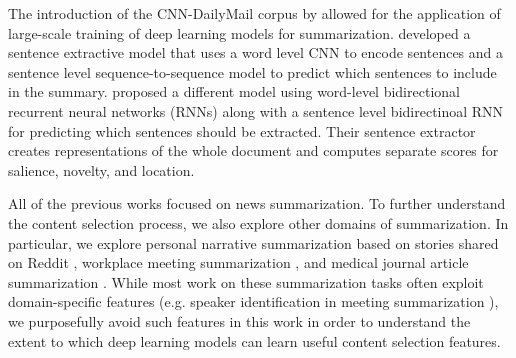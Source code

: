 The introduction of the CNN-DailyMail corpus by \citet{nips15_hermann} 
allowed for the application of large-scale training of deep learning models for summarization.
\citet{cheng2016neural} %
developed a sentence extractive
model that uses a word level 
CNN to encode 
sentences and a sentence level sequence-to-sequence model to predict 
which sentences to include in the summary. \citet{nallapati2017summarunner}
proposed a different model using word-level bidirectional recurrent neural 
networks (RNNs) along with a sentence level bidirectinoal RNN for 
predicting which sentences should be extracted. 
Their sentence
extractor creates representations of the whole document and computes 
separate scores for salience, novelty, and location.


All of the previous works 
focused on news summarization. To further
understand the content selection process, we also explore other domains 
of summarization. In particular, we explore 
personal narrative summarization based on stories shared
on Reddit \cite{ouyang2017crowd}, workplace meeting summarization
\cite{carletta2005ami}, and medical journal article summarization 
\cite{mishra2014text}. While most work on these summarization tasks
 often exploit domain-specific features (e.g. speaker identification in meeting summarization \cite{gillick2009global}),
we purposefully avoid such features in this work in order to understand 
the extent to which deep learning models can learn useful content 
selection features.


